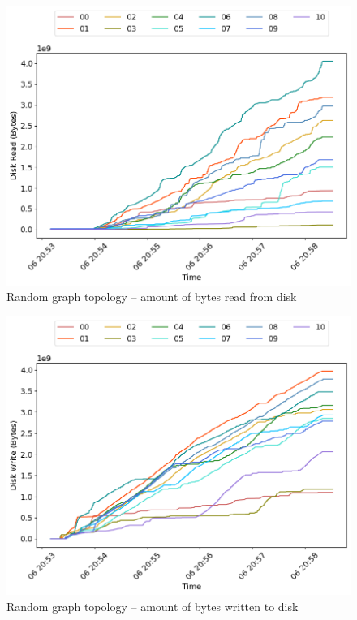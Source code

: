 \begin{minipage}{0.5\linewidth}
\begin{figure}[H]
\captionsetup{justification=centering,width=0.8\linewidth}
\includegraphics[width=\linewidth]{figures/graph-random/blk_read.png}
\caption{Random graph topology -- amount of bytes read from disk}
\label{fig:graph-random-net_read}
\end{figure}
\end{minipage}
\begin{minipage}{0.5\linewidth}
\begin{figure}[H]
\captionsetup{justification=centering,width=0.8\linewidth}
\includegraphics[width=\linewidth]{figures/graph-random/blk_write.png}
\caption{Random graph topology -- amount of bytes written to disk}
\label{fig:graph-random-net_write}
\end{figure}
\end{minipage}

